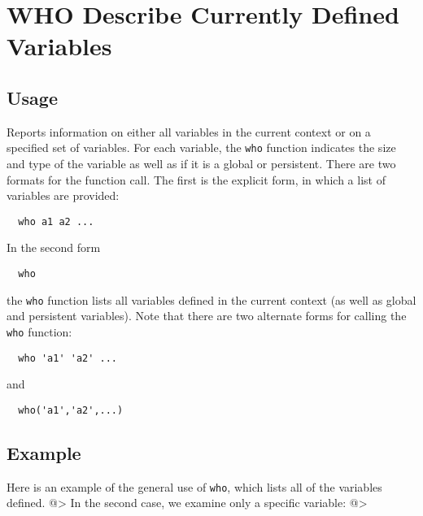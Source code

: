 \section{WHO Describe Currently Defined Variables}

\subsection{Usage}

Reports information on either all variables in the current context
or on a specified set of variables.  For each variable, the \verb|who|
function indicates the size and type of the variable as well as 
if it is a global or persistent.  There are two formats for the 
function call.  The first is the explicit form, in which a list
of variables are provided:
\begin{verbatim}
  who a1 a2 ...
\end{verbatim}
In the second form
\begin{verbatim}
  who
\end{verbatim}
the \verb|who| function lists all variables defined in the current 
context (as well as global and persistent variables). Note that
there are two alternate forms for calling the \verb|who| function:
\begin{verbatim}
  who 'a1' 'a2' ...
\end{verbatim}
and
\begin{verbatim}
  who('a1','a2',...)
\end{verbatim}
\subsection{Example}

Here is an example of the general use of \verb|who|, which lists all of the variables defined.
@>
In the second case, we examine only a specific variable:
@>
